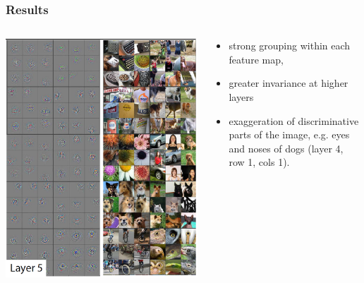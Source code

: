 \begin{frame}
	\frametitle{Results}
	
			
	\begin{columns} %
		\begin{column}{.6\textwidth}
		\begin{center}
			\includegraphics[scale=0.5]{figs/ZFnet_layer5}
		\end{center}	
		\end{column}%
		
		
		
		\begin{column}{.4\textwidth}
			
			
			\bigskip 
			
			\begin{itemize}
				\item strong grouping within each feature map,
				
				\medskip 
				
				\item greater invariance at higher layers
				
				\medskip 
								
				\item exaggeration of discriminative parts of the image, e.g. eyes and noses of dogs (layer 4, row 1, cols 1).
				
			\end{itemize}
		\end{column}%
	\end{columns}





\end{frame}

